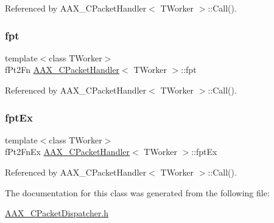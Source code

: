 Referenced by A\+A\+X\+\_\+\+C\+Packet\+Handler$<$ T\+Worker $>$\+::\+Call().

\mbox{\label{a01525_a9350d1cc36f20c821c90d2372219561f}} 
\subsubsection{\texorpdfstring{fpt}{fpt}}
{\footnotesize\ttfamily template$<$class T\+Worker$>$ \\
f\+Pt2\+Fn \mbox{\hyperlink{a01525}{A\+A\+X\+\_\+\+C\+Packet\+Handler}}$<$ T\+Worker $>$\+::fpt\hspace{0.3cm}{\ttfamily [protected]}}



Referenced by A\+A\+X\+\_\+\+C\+Packet\+Handler$<$ T\+Worker $>$\+::\+Call().

\mbox{\label{a01525_aca6624820388e64f13d1b824dde033f5}} 
\subsubsection{\texorpdfstring{fptEx}{fptEx}}
{\footnotesize\ttfamily template$<$class T\+Worker$>$ \\
f\+Pt2\+Fn\+Ex \mbox{\hyperlink{a01525}{A\+A\+X\+\_\+\+C\+Packet\+Handler}}$<$ T\+Worker $>$\+::fpt\+Ex\hspace{0.3cm}{\ttfamily [protected]}}



Referenced by A\+A\+X\+\_\+\+C\+Packet\+Handler$<$ T\+Worker $>$\+::\+Call().



The documentation for this class was generated from the following file\+:\begin{DoxyCompactItemize}
\item 
\mbox{\hyperlink{a00452}{A\+A\+X\+\_\+\+C\+Packet\+Dispatcher.\+h}}\end{DoxyCompactItemize}
